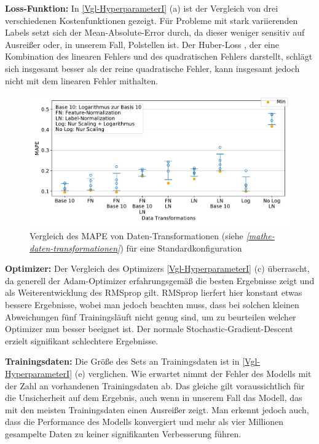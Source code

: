 \textbf{Loss-Funktion:}
In \textsf{\autoref{Vgl-HyperparameterI} (a)}  ist der Vergleich von drei verschiedenen Kostenfunktionen gezeigt. Für Probleme mit stark variierenden Labels setzt sich der Mean-Absolute-Error durch, da dieser weniger sensitiv auf Ausreißer oder, in unserem Fall, Polstellen ist. Der Huber-Loss \cite{huber}, der eine Kombination des linearen Fehlers und des quadratischen Fehlers darstellt, schlägt sich insgesamt besser als der reine quadratische Fehler, kann insgesamt jedoch nicht mit dem linearen Fehler mithalten. 
\begin{figure}[bt!] %
	\centering
	\includegraphics[width=14cm]{graphics/17,18}
	\caption{Vergleich des MAPE von Daten-Transformationen (siehe \textit{\autoref{mathe-daten-transformationen}}) für eine Standardkonfiguration}
	\label{Daten-Transformationen}
\end{figure}

\textbf{Optimizer:} Der Vergleich des Optimizers \textsf{\autoref{Vgl-HyperparameterI} (c)} überrascht, da generell der Adam-Optimizer \cite{Adam} erfahrungsgemäß die besten Ergebnisse zeigt und als Weiterentwicklung des RMSprop \cite{RMSprop} gilt. RMSprop lierfert hier konstant etwas bessere Ergebnisse, wobei man jedoch beachten muss, dass bei solchen kleinen Abweichungen fünf Trainingsläuft nicht genug sind, um zu beurteilen welcher Optimizer nun besser beeignet ist. Der normale Stochastic-Gradient-Descent erzielt signifikant schlechtere Ergebnisse. 

\textbf{Trainingsdaten:}
Die Größe des Sets an Trainingsdaten ist in \textsf{\autoref{Vgl-HyperparameterI} (e)}  verglichen. Wie erwartet nimmt der Fehler des Modells mit der Zahl an vorhandenen Trainingsdaten ab. Das gleiche gilt voraussichtlich für die Unsicherheit auf dem Ergebnis, auch wenn in unserem Fall das Modell, das mit den meisten Trainingsdaten einen Ausreißer zeigt. Man erkennt jedoch auch, dass die Performance des Modells konvergiert und mehr als vier Millionen gesampelte Daten zu keiner signifikanten Verbesserung führen. 

